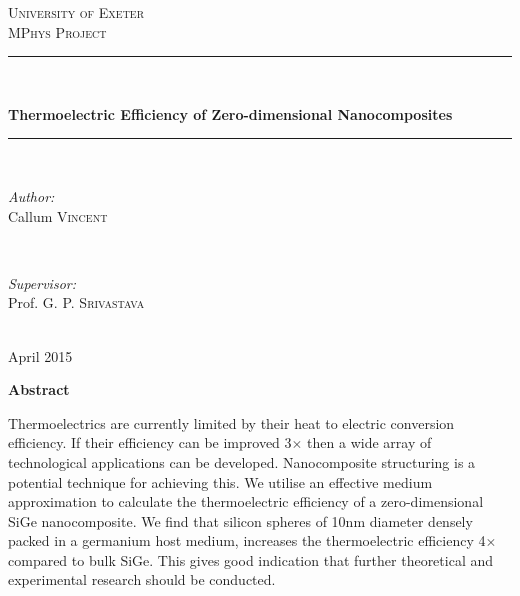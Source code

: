 \documentclass[12pt]{article}
\begin{document}

\pagestyle{empty}

\begin{titlepage}
\center
\textsc{\huge University of Exeter}\\[1cm]
\textsc{\Large MPhys Project}\\[1.5cm]

\rule{\linewidth}{0.5mm}\\[0.4cm]
\begin{doublespace}
{\LARGE \textbf{Thermoelectric Efficiency of Zero-dimensional Nanocomposites}}\\[0cm]
\end{doublespace}
\rule{\linewidth}{0.5mm}\\[2.5cm]
 
\begin{minipage}{0.4\textwidth}
\begin{flushleft} \large
\emph{Author:}\\
Callum \textsc{Vincent}
\end{flushleft}
\end{minipage}
~
\begin{minipage}{0.4\textwidth}
\begin{flushright} \large
\emph{Supervisor:} \\
Prof. G. P. \textsc{Srivastava}
\end{flushright}
\end{minipage}\\[4cm]

{\large April 2015}

\pagedecorationleft
\pagedecorationright
\end{titlepage}

\begin{center}
{\Huge\textbf{Abstract}}\\[2cm]
\end{center}
\begin{justify}
Thermoelectrics are currently limited by their heat to electric conversion efficiency. If their efficiency can be improved 3$\times$ then a wide array of technological applications can be developed. Nanocomposite structuring is a potential technique for achieving this. We utilise an effective medium approximation to calculate the thermoelectric efficiency of a zero-dimensional SiGe nanocomposite. We find that silicon spheres of 10nm diameter densely packed in a germanium host medium, increases the thermoelectric efficiency 4$\times$ compared to bulk SiGe. This gives good indication that further theoretical and experimental research should be conducted.
\end{justify}
\end{document}
